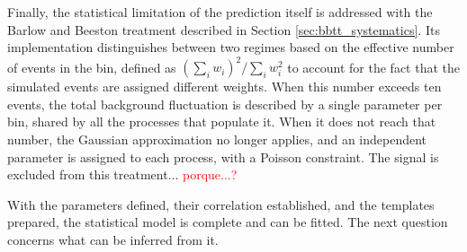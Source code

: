 

Finally, the statistical limitation of the prediction itself is addressed with the Barlow and Beeston treatment described in Section \ref{sec:bbtt_systematics}. Its implementation distinguishes between two regimes based on the effective number of events in the bin, defined as $(\sum_i w_i)^2/\sum_i w_i^2$ to account for the fact that the simulated events are assigned different weights. When this number exceeds ten events, the total background fluctuation is described by a single parameter per bin, shared by all the processes that populate it. When it does not reach that number, the Gaussian approximation no longer applies, and an independent parameter is assigned to each process, with a Poisson constraint. The signal is excluded from this treatment... \textcolor{red}{porque...?}


With the parameters defined, their correlation established, and the templates prepared, the statistical model is complete and can be fitted. The next question concerns what can be inferred from it.


